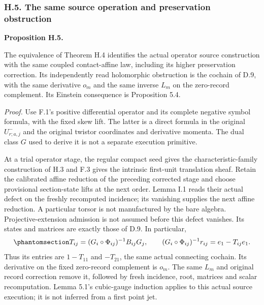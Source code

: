\documentclass[
  english,
  11pt,
  reqno]{amsart}
\makeatletter
\newcommand{\pandocstatementheading}[1]{%
  \par\addpenalty{\@beginparpenalty}%
  \addvspace{.5\baselineskip plus .2\baselineskip minus .2\baselineskip}%
  {\normalfont\bfseries #1\par}%
  \nobreak\@afterindenttrue\@afterheading
}
\makeatother
\begin{document}
\subsubsection{H.5. The same source operation and preservation
obstruction}\label{h.5.-the-same-source-operation-and-preservation-obstruction}

\pandocstatementheading{\protect{}\label{prop:gg-independent-op-active-comparison}Proposition H.5.}

The equivalence of Theorem H.4 identifies the actual operator source
construction with the same coupled contact-affine law, including its
higher preservation correction. Its independently read holomorphic
obstruction is the cochain of D.9, with the same derivative \(o_m\) and
the same inverse \(L_m\) on the zero-record complement. Its Einstein
consequence is Proposition 5.4.

\emph{Proof.} Use F.1's positive differential operator and its complete
negative symbol formula, with the fixed skew lift. The latter is a
direct formula in the original \(U^-_{r;a,j}\) and the original twistor
coordinates and derivative momenta. The dual class \(G\) used to derive
it is not a separate execution primitive.

At a trial operator stage, the regular compact seed gives the
characteristic-family construction of H.3 and F.3 gives the intrinsic
first-unit translation sheaf. Retain the calibrated affine reduction of
the preceding corrected stage and choose provisional section-state lifts
at the next order. Lemma I.1 reads their actual defect on the freshly
recomputed incidence; its vanishing supplies the next affine reduction.
A particular torsor is not manufactured by the bare algebra.
Projective-extension admission is not assumed before this defect
vanishes. Its states and matrices are exactly those of D.9. In
particular,
\begin{equation}\protect\phantomsection\label{eq:gg-independent-op-same-obstruction}{
 T_{ij}=(G_i\circ\Phi_{ij})^{-1}B_{ij}G_j,\qquad
 (G_i\circ\Phi_{ij})^{-1}r_{ij}=e_1-T_{ij}e_1.
}\end{equation} Thus its entries are \(1-T_{11}\) and \(-T_{21}\), the
same actual connecting cochain. Its derivative on the fixed zero-record
complement is \(o_m\). The same \(L_m\) and original record correction
remove it, followed by fresh incidence, root, matrices and scalar
recomputation. Lemma 5.1's cubic-gauge induction applies to this actual
source execution; it is not inferred from a first point jet.
\end{document}
